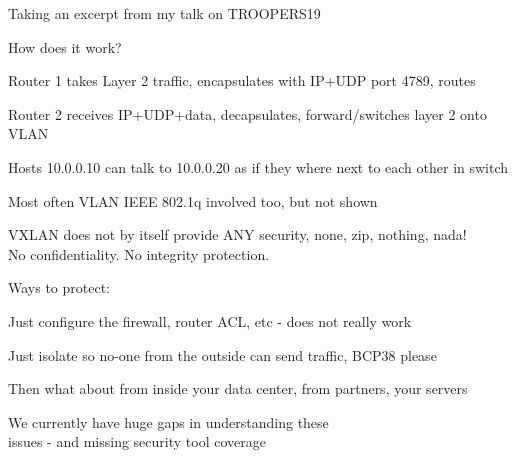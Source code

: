 \documentclass[Screen16to9,17pt]{foils}
\begin{document}


Taking an excerpt from my talk on TROOPERS19\\
{\footnotesize{}}



How does it work?

\begin{list2}
\item Router 1 takes Layer 2 traffic, encapsulates with IP+UDP port 4789, routes
\item Router 2 receives IP+UDP+data, decapsulates, forward/switches layer 2 onto VLAN
\item Hosts 10.0.0.10 can talk to 10.0.0.20 as if they where next to each other in switch
\item Most often VLAN IEEE 802.1q involved too, but not shown
\end{list2}



VXLAN does not by itself provide ANY security,
none, zip, nothing, nada! \\
No confidentiality. No integrity protection.

\vskip 5mm

Ways to protect:
\begin{list2}
\item Just configure the firewall, router ACL, etc - does not really work
\item Just isolate so no-one from the outside can send traffic, BCP38 please
\item Then what about from inside your data center, from partners, your servers
\end{list2}

\vskip 1cm
{\Large We currently have huge gaps in understanding these\\
issues - and missing security tool coverage}



\end{document}
